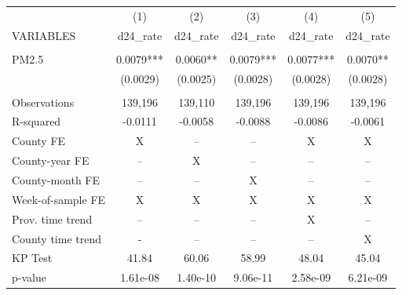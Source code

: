\begin{tabular}{lccccc} \hline
 & (1) & (2) & (3) & (4) & (5) \\
VARIABLES & d24\_rate & d24\_rate & d24\_rate & d24\_rate & d24\_rate \\ \hline
 &  &  &  &  &  \\
PM2.5 & 0.0079*** & 0.0060** & 0.0079*** & 0.0077*** & 0.0070** \\
 & (0.0029) & (0.0025) & (0.0028) & (0.0028) & (0.0028) \\
 &  &  &  &  &  \\
Observations & 139,196 & 139,110 & 139,196 & 139,196 & 139,196 \\
R-squared & -0.0111 & -0.0058 & -0.0088 & -0.0086 & -0.0061 \\
County FE & X & -- & -- & X & X \\
County-year FE & -- & X & -- & -- & -- \\
County-month FE & -- & -- & X & -- & -- \\
Week-of-sample FE & X & X & X & X & X \\
Prov. time trend & -- & -- & -- & X & -- \\
County time trend & - & -- & -- & -- & X \\
KP Test & 41.84 & 60.06 & 58.99 & 48.04 & 45.04 \\
 p-value & 1.61e-08 & 1.40e-10 & 9.06e-11 & 2.58e-09 & 6.21e-09 \\ \hline
\end{tabular}
